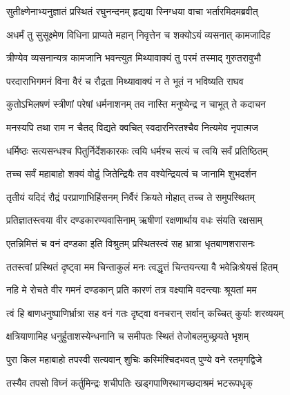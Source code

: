 
\twolineshloka
{सुतीक्ष्णेनाभ्यनुज्ञातं प्रस्थितं रघुनन्दनम्}
{हृद्यया स्निग्धया वाचा भर्तारमिदमब्रवीत्} %

\twolineshloka
{अधर्मं तु सुसूक्ष्मेण विधिना प्राप्यते महान्}
{निवृत्तेन च शक्योऽयं व्यसनात् कामजादिह} %

\twolineshloka
{त्रीण्येव व्यसनान्यत्र कामजानि भवन्त्युत}
{मिथ्यावाक्यं तु परमं तस्माद् गुरुतरावुभौ} %

\twolineshloka
{परदाराभिगमनं विना वैरं च रौद्रता}
{मिथ्यावाक्यं न ते भूतं न भविष्यति राघव} %

\twolineshloka
{कुतोऽभिलषणं स्त्रीणां परेषां धर्मनाशनम्}
{तव नास्ति मनुष्येन्द्र न चाभूत् ते कदाचन} %

\twolineshloka
{मनस्यपि तथा राम न चैतद् विद्यते क्वचित्}
{स्वदारनिरतश्चैव नित्यमेव नृपात्मज} %

\twolineshloka
{धर्मिष्ठः सत्यसन्धश्च पितुर्निर्देशकारकः}
{त्वयि धर्मश्च सत्यं च त्वयि सर्वं प्रतिष्ठितम्} %

\twolineshloka
{तच्च सर्वं महाबाहो शक्यं वोढुं जितेन्द्रियैः}
{तव वश्येन्द्रियत्वं च जानामि शुभदर्शन} %

\twolineshloka
{तृतीयं यदिदं रौद्रं परप्राणाभिहिंसनम्}
{निर्वैरं क्रियते मोहात् तच्च ते समुपस्थितम्} %

\twolineshloka
{प्रतिज्ञातस्त्वया वीर दण्डकारण्यवासिनाम्}
{ऋषीणां रक्षणार्थाय वधः संयति रक्षसाम्} %

\twolineshloka
{एतन्निमित्तं च वनं दण्डका इति विश्रुतम्}
{प्रस्थितस्त्वं सह भ्रात्रा धृतबाणशरासनः} %

\twolineshloka
{ततस्त्वां प्रस्थितं दृष्ट्वा मम चिन्ताकुलं मनः}
{त्वद्धृत्तं चिन्तयन्त्या वै भवेन्निःश्रेयसं हितम्} %

\twolineshloka
{नहि मे रोचते वीर गमनं दण्डकान् प्रति}
{कारणं तत्र वक्ष्यामि वदन्त्याः श्रूयतां मम} %

\twolineshloka
{त्वं हि बाणधनुष्पाणिर्भ्रात्रा सह वनं गतः}
{दृष्ट्वा वनचरान् सर्वान् कच्चित् कुर्याः शरव्ययम्} %

\twolineshloka
{क्षत्रियाणामिह धनुर्हुताशस्येन्धनानि च}
{समीपतः स्थितं तेजोबलमुच्छ्रयते भृशम्} %

\twolineshloka
{पुरा किल महाबाहो तपस्वी सत्यवान् शुचिः}
{कस्मिंश्चिदभवत् पुण्ये वने रतमृगद्विजे} %

\twolineshloka
{तस्यैव तपसो विघ्नं कर्तुमिन्द्रः शचीपतिः}
{खड्गपाणिरथागच्छदाश्रमं भटरूपधृक्} %

